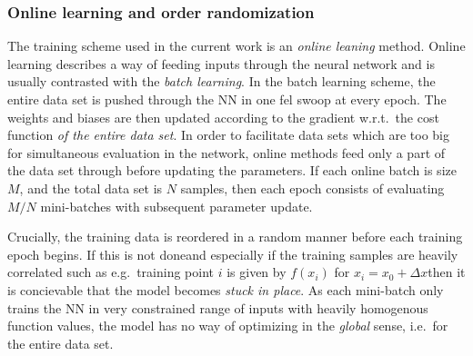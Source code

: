 \documentclass[../../master.tex]{subfiles}
\begin{document}
\subsubsection{Online learning and order randomization}
The training scheme used in the current work is an \emph{online leaning} method. Online learning describes a way of feeding inputs through the neural network and is usually contrasted with the \emph{batch learning}. In the batch learning scheme, the entire data set is pushed through the NN in one fel swoop at every epoch. The weights and biases are then updated according to the gradient w.r.t.\ the cost function \emph{of the entire data set}. In order to facilitate data sets which are too big for simultaneous evaluation in the network, online methods feed only a part of the data set through before updating the parameters. If each online batch is size $M$, and the total data set is $N$ samples, then each epoch consists of evaluating $M/N$ mini-batches with subsequent parameter update. 

Crucially, the training data is reordered in a random manner before each training epoch begins. If this is not done\textemdash and especially if the training samples are heavily correlated such as e.g.\ training point $i$ is given by $f(x_i)$ for $x_i=x_0+\mathit{\Delta}x$\textemdash then it is concievable that the model becomes \emph{stuck in place}. As each mini-batch only trains the NN in very constrained range of inputs with heavily homogenous function values, the model has no way of optimizing in the \emph{global} sense, i.e.\ for the entire data set. 
\end{document}
